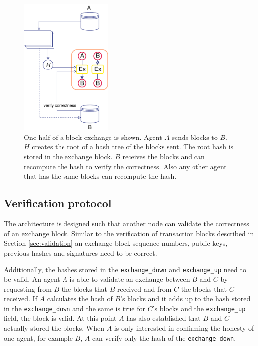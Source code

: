 \begin{figure}[!ht]
    \centering
    \includegraphics[width=0.4\textwidth]{images/trustchain-3.pdf}
    \caption{One half of a block exchange is shown. Agent $A$ sends blocks to $B$. $H$ creates the 
    root of a hash tree of the blocks sent. The root hash is stored in the
    exchange block. $B$ receives the blocks and can recompute the hash to verify the correctness.
    Also any other agent that has the same blocks can recompute the hash.}
    \label{fig:block_exchange}
\end{figure}

\subsection{Verification protocol}
The architecture is designed such that another node can validate the correctness of an exchange
block. Similar to the verification of transaction blocks described in Section \ref{sec:validation} an 
exchange block sequence numbers, public keys, previous hashes and signatures need to be correct. 

Additionally, the hashes stored in the \verb|exchange_down| and \verb|exchange_up| need to be valid.
An agent $A$ is able to validate an exchange between $B$ and $C$ by requesting from $B$ the blocks 
that $B$ received and from $C$ the blocks that $C$ received. If $A$ calculates the hash of $B$'s blocks
and it adds up to the hash stored in the \verb|exchange_down| and the same is true for $C$'s blocks and
the \verb|exchange_up| field, the block is valid. At this point $A$ has also established that $B$ 
and $C$ actually stored the blocks. When $A$ is only interested in confirming the honesty of one 
agent, for example $B$, $A$ can verify only the hash of the \verb|exchange_down|.

